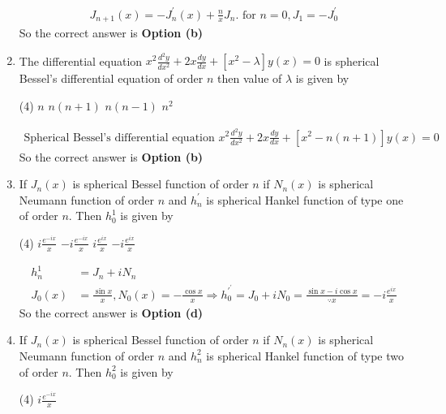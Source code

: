 \begin{enumerate}[label=\color{ocre}\textbf{\arabic*.}]
\begin{answer}
	\begin{align*}
J_{n+1}(x)=-J_{n}^{\prime}(x)+\frac{n}{x} J_{n}\text{. for }n=0, J_{1}=-J_{0}^{\prime}
	\end{align*}
		So the correct answer is \textbf{Option (b)}
\end{answer}
\item  The differential equation $x^{2} \frac{d^{2} y}{d x^{2}}+2 x \frac{d y}{d x}+\left[x^{2}-\lambda\right] y(x)=0$ is spherical Bessel's differential equation of order $n$ then value of $\lambda$ is given by
 \begin{tasks}(4)
	\task[\textbf{a.}]$n$
	\task[\textbf{b.}]$n(n+1)$
	\task[\textbf{c.}] $n(n-1)$
	\task[\textbf{d.}]  $n^{2}$
\end{tasks}
\begin{answer}
	\begin{align*}
\text{Spherical Bessel's differential equation }x^{2} \frac{d^{2} y}{d x^{2}}+2 x \frac{d y}{d x}+\left[x^{2}-n(n+1)\right] y(x)=0
	\end{align*}
		So the correct answer is \textbf{Option (b)}
\end{answer}
\item If $J_{n}(x)$ is spherical Bessel function of order $n$ if $N_{n}(x)$ is spherical Neumann function of order $n$ and $h_{n}^{\prime}$ is spherical Hankel function of type one of order $n$. Then $h_{0}^{1}$ is given by
 \begin{tasks}(4)
	\task[\textbf{a.}]$i \frac{e^{-i x}}{x}$
	\task[\textbf{b.}]$-i \frac{e^{-i x}}{x}$
	\task[\textbf{c.}] $i \frac{e^{i x}}{x}$
	\task[\textbf{d.}] $-i \frac{e^{i x}}{x}$
\end{tasks}
\begin{answer}
	\begin{align*}
		h_{n}^{1}&=J_{n}+i N_{n}\\
	J_{0}(x)&=\frac{\sin x}{x}, N_{0}(x)=-\frac{\cos x}{x} \Rightarrow h_{0}^{\prime^{\prime}}=J_{0}+i N_{0}=\frac{\sin x-i \cos x}{\because x}=-i \frac{e^{i x}}{x}
	\end{align*}
	So the correct answer is \textbf{Option (d)}
\end{answer}
\item If $J_{n}(x)$ is spherical Bessel function of order $n$ if $N_{n}(x)$ is spherical Neumann function of order $n$ and $h_{n}^{2}$ is spherical Hankel function of type two of order $n$. Then $h_{0}^{2}$ is given by
 \begin{tasks}(4)
	\task[\textbf{a.}] $i \frac{e^{-i x}}{x}$

\end{tasks}
\end{enumerate}
